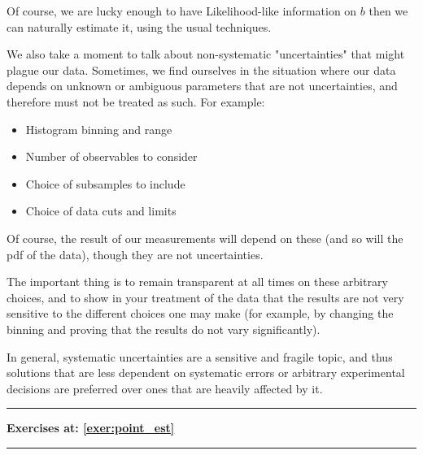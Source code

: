 Of course, we are lucky enough to have Likelihood-like information on $b$ then we can naturally estimate it, using the usual techniques. 

We also take a moment to talk about non-systematic "uncertainties" that might plague our data. Sometimes, we find ourselves in the situation where our data depends on unknown or ambiguous parameters that are not uncertainties, and therefore must not be treated as such. For example:
\begin{itemize}
	\item Histogram binning and range
	\item Number of observables to consider
	\item Choice of subsamples to include
	\item Choice of data cuts and limits
\end{itemize}

Of course, the result of our measurements will depend on these (and so will the pdf of the data), though they are not uncertainties. 

The important thing is to remain transparent at all times on these arbitrary choices, and to show in your treatment of the data that the results are not very sensitive to the different choices one may make (for example, by changing the binning and proving that the results do not vary significantly).

In general, systematic uncertainties are a sensitive and fragile topic, and thus solutions that are less dependent on systematic errors or arbitrary experimental decisions are preferred over ones that are heavily affected by it.

\vspace*{1cm}
\hrule
\begin{center}
	\textbf{Exercises at: \ref{exer:point_est}}
\end{center}
\hrule